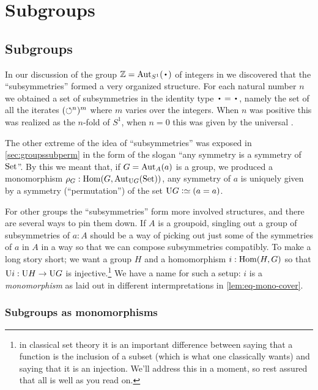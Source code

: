 \chapter{Subgroups}
\label{ch:subgroups}
\section{Subgroups}
\label{sec:subgroups}
In our discussion of the group $\ZZ=\aut_{S^1}(\base)$ of integers in we discovered that the ``subsymmetries'' formed a very organized structure.
For each natural number $n$ we obtained a set of subsymmetries in the identity type $\base=\base$, namely the set of all the iterates $(\circlearrowleft^{n})^m$ where $m$ varies over the integers.
When $n$ was positive this was realized as the $n$-fold \covering of $S^1$, when $n=0$ this was given by the universal \covering.


The other extreme of the idea of ``subsymmetries'' was exposed in \cref{sec:groupssubperm} in the form of the slogan ``any symmetry is a symmetry of $\mathrm{Set}$''.
By this we meant that, if $G=\aut_A(a)$ is a group, we produced a monomorphism $\rho_G:\Hom(G,\aut_{\USym G}(\Set))$, \ie any symmetry of $a$ is uniquely given by a symmetry (``permutation'') of the set $\USym G\defequi (a=a)$.

For other groups the ``subsymmetries'' form more involved structures,
and there are several ways to pin them down.  If $A$ is a groupoid, singling out a group of subsymmetries of $a:A$ should be a way of picking out just some of the symmetries of $a$ in $A$ in a way so that we can compose subsymmetries compatibly.  To make a long story short; we want a group $H$ and a homomorphism $i:\Hom(H,G)$ so that $\mathrm{U} i:\mathrm{U} H\to\mathrm{U} G$ is injective.\footnote{in classical set theory it is an important difference between saying that a function is the inclusion of a subset (which is what one classically wants) and saying that it is an injection.  We'll address this in a moment, so rest assured that all is well as you read on.}  We have a name for such a setup: $i$ is a \emph{monomorphism} as laid out in different intermpretations in \cref{lem:eq-mono-cover}.

\subsection{Subgroups as monomorphisms}

